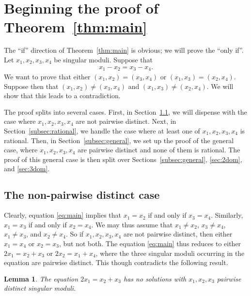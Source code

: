 \documentclass[12pt,a4paper,oneside]{amsart}
\newtheorem{lemma}[theorem]{Lemma}
\begin{document}
    
 
   

	
	\section{Beginning the proof of Theorem~{\ref{thm:main}}}\label{sec:easy}
	
	The ``if'' direction of Theorem~\ref{thm:main} is obvious; we will prove the ``only if''. Let $x_1, x_2, x_3, x_4$ be singular moduli. Suppose that
	\begin{align}\label{eq:main}
		x_1 - x_2 = x_3 - x_4.
		\end{align}
	We want to prove that either $(x_1, x_2) = (x_3, x_4)$ or $(x_1, x_3) = (x_2, x_4)$. Suppose then that $(x_1, x_2) \neq (x_3, x_4)$ and $(x_1, x_3) \neq (x_2, x_4)$. We will show that this leads to a contradiction.

    The proof splits into several cases.
    First, in Section~\ref{subsec:equal}, we will dispense with the case where $x_1, x_2, x_3, x_4$ are not pairwise distinct.
   Next, in Section~\ref{subsec:rational}, we handle the case where at least one of $x_1, x_2, x_3, x_4$ is rational.
    Then, in Section~\ref{subsec:general}, we set up the proof of the general case, where $x_1, x_2, x_3, x_4$ are pairwise distinct and none of them is rational.
    The proof of this general case is then split over Sections~\ref{subsec:general}, \ref{sec:2dom}, and \ref{sec:3dom}.
	
	\subsection{The non-pairwise distinct case}\label{subsec:equal}
	
	Clearly, equation \eqref{eq:main} implies that $x_1 = x_2$ if and only if $x_3 = x_4$. Similarly, $x_1 = x_3$ if and only if $x_2 = x_4$. We may thus assume that $x_1 \neq x_2$, $x_3 \neq x_4$, $x_1 \neq x_3$, and $x_2 \neq x_4$. So if $x_1, x_2, x_3, x_4$ are not pairwise distinct, then either $x_1 = x_4$ or $x_2 = x_3$, but not both. The equation \eqref{eq:main} thus reduces to either $2 x_1 = x_2 + x_3$ or $2 x_2 = x_1 + x_4$, where the three singular moduli occurring in the equation are pairwise distinct. This though contradicts the following result.
	
	\begin{lemma}\label{lem:three}
	The equation $2 x_1 = x_2 + x_3$ has no solutions with $x_1, x_2, x_3$ pairwise distinct singular moduli.
	\end{lemma}
\end{document}
